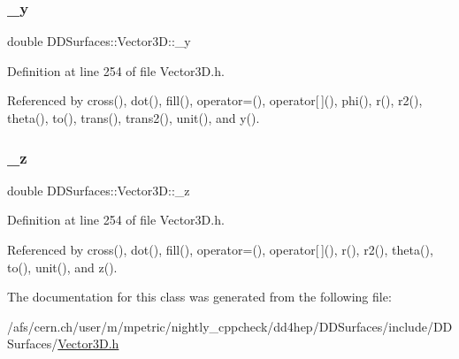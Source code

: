 \subsubsection{\texorpdfstring{\+\_\+y}{\_y}}
{\footnotesize\ttfamily double D\+D\+Surfaces\+::\+Vector3\+D\+::\+\_\+y\hspace{0.3cm}{\ttfamily [protected]}}



Definition at line 254 of file Vector3\+D.\+h.



Referenced by cross(), dot(), fill(), operator=(), operator\mbox{[}$\,$\mbox{]}(), phi(), r(), r2(), theta(), to(), trans(), trans2(), unit(), and y().

\hypertarget{class_d_d_surfaces_1_1_vector3_d_a8cfed9e9ca399b20c9b4d3bbb5692bc9}{}\label{class_d_d_surfaces_1_1_vector3_d_a8cfed9e9ca399b20c9b4d3bbb5692bc9} 
\subsubsection{\texorpdfstring{\+\_\+z}{\_z}}
{\footnotesize\ttfamily double D\+D\+Surfaces\+::\+Vector3\+D\+::\+\_\+z\hspace{0.3cm}{\ttfamily [protected]}}



Definition at line 254 of file Vector3\+D.\+h.



Referenced by cross(), dot(), fill(), operator=(), operator\mbox{[}$\,$\mbox{]}(), r(), r2(), theta(), to(), unit(), and z().



The documentation for this class was generated from the following file\+:\begin{DoxyCompactItemize}
\item 
/afs/cern.\+ch/user/m/mpetric/nightly\+\_\+cppcheck/dd4hep/\+D\+D\+Surfaces/include/\+D\+D\+Surfaces/\hyperlink{_vector3_d_8h}{Vector3\+D.\+h}\end{DoxyCompactItemize}

